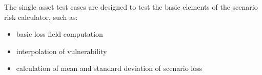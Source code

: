 The single asset test cases are designed to test the basic elements of the scenario risk calculator, such as:

\begin{itemize}
\item basic loss field computation
\item interpolation of vulnerability
\item calculation of mean and standard deviation of scenario loss
\end{itemize}

